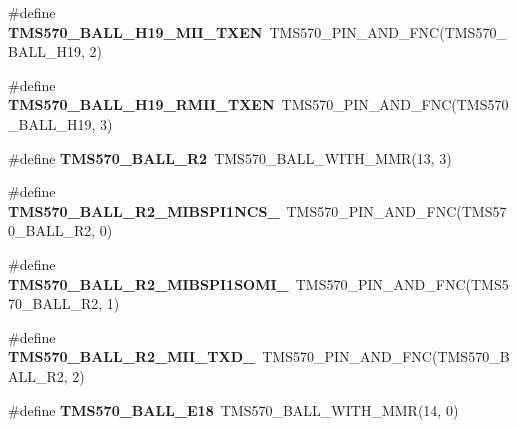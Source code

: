 \begin{DoxyCompactItemize}
\item 
\mbox{\label{tms570ls3137zwt-pins_8h_a815cc1e0f301f8847457fdc58bf2e613}} 
\#define {\bfseries T\+M\+S570\+\_\+\+B\+A\+L\+L\+\_\+\+H19\+\_\+\+M\+I\+I\+\_\+\+T\+X\+EN}~T\+M\+S570\+\_\+\+P\+I\+N\+\_\+\+A\+N\+D\+\_\+\+F\+NC(T\+M\+S570\+\_\+\+B\+A\+L\+L\+\_\+\+H19, 2)
\item 
\mbox{\label{tms570ls3137zwt-pins_8h_a8157acdeb684c3468e6c738eac416d34}} 
\#define {\bfseries T\+M\+S570\+\_\+\+B\+A\+L\+L\+\_\+\+H19\+\_\+\+R\+M\+I\+I\+\_\+\+T\+X\+EN}~T\+M\+S570\+\_\+\+P\+I\+N\+\_\+\+A\+N\+D\+\_\+\+F\+NC(T\+M\+S570\+\_\+\+B\+A\+L\+L\+\_\+\+H19, 3)
\item 
\mbox{\label{tms570ls3137zwt-pins_8h_a5a9763f993e5d136e0d3e539d5fc38ec}} 
\#define {\bfseries T\+M\+S570\+\_\+\+B\+A\+L\+L\+\_\+\+R2}~T\+M\+S570\+\_\+\+B\+A\+L\+L\+\_\+\+W\+I\+T\+H\+\_\+\+M\+MR(13, 3)
\item 
\mbox{\label{tms570ls3137zwt-pins_8h_ab30a7e0ec74482d0ebb61c82dce0bafa}} 
\#define {\bfseries T\+M\+S570\+\_\+\+B\+A\+L\+L\+\_\+\+R2\+\_\+\+M\+I\+B\+S\+P\+I1\+N\+C\+S\+\_}~T\+M\+S570\+\_\+\+P\+I\+N\+\_\+\+A\+N\+D\+\_\+\+F\+NC(T\+M\+S570\+\_\+\+B\+A\+L\+L\+\_\+\+R2, 0)
\item 
\mbox{\label{tms570ls3137zwt-pins_8h_ac9720ed5bfa58d7fcb5c4ef69f1895c4}} 
\#define {\bfseries T\+M\+S570\+\_\+\+B\+A\+L\+L\+\_\+\+R2\+\_\+\+M\+I\+B\+S\+P\+I1\+S\+O\+M\+I\+\_}~T\+M\+S570\+\_\+\+P\+I\+N\+\_\+\+A\+N\+D\+\_\+\+F\+NC(T\+M\+S570\+\_\+\+B\+A\+L\+L\+\_\+\+R2, 1)
\item 
\mbox{\label{tms570ls3137zwt-pins_8h_a2a6f59fee12e1bd67152c5f7138198d4}} 
\#define {\bfseries T\+M\+S570\+\_\+\+B\+A\+L\+L\+\_\+\+R2\+\_\+\+M\+I\+I\+\_\+\+T\+X\+D\+\_}~T\+M\+S570\+\_\+\+P\+I\+N\+\_\+\+A\+N\+D\+\_\+\+F\+NC(T\+M\+S570\+\_\+\+B\+A\+L\+L\+\_\+\+R2, 2)
\item 
\mbox{\label{tms570ls3137zwt-pins_8h_a7a5660d9f1c5b62564a03c3d5fe40760}} 
\#define {\bfseries T\+M\+S570\+\_\+\+B\+A\+L\+L\+\_\+\+E18}~T\+M\+S570\+\_\+\+B\+A\+L\+L\+\_\+\+W\+I\+T\+H\+\_\+\+M\+MR(14, 0)
\item 

\end{DoxyCompactItemize}
